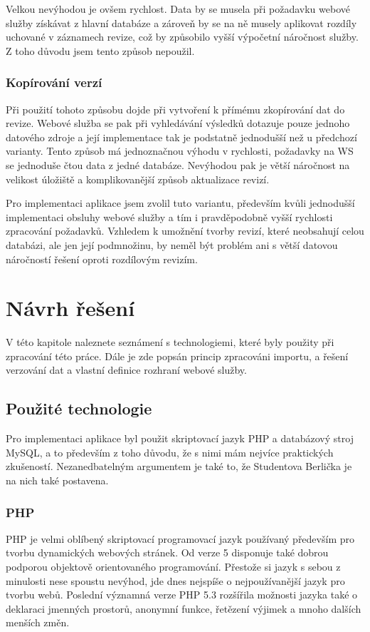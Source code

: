 \documentclass[11pt,twoside,a4paper]{book}
\begin{document}
Velkou nevýhodou je ovšem rychlost. Data by se musela při požadavku webové služby získávat z hlavní databáze a zároveň by se na ně musely aplikovat rozdíly uchované v záznamech revize, což by způsobilo vyšší výpočetní náročnost služby. Z toho důvodu jsem tento způsob nepoužil.

\subsection{Kopírování verzí}
Při použití tohoto způsobu dojde při vytvoření k přímému zkopírování dat do revize. Webové služba se pak při vyhledávání výsledků dotazuje pouze jednoho datového zdroje a její implementace tak je podstatně jednodušší než u předchozí varianty. Tento způsob má jednoznačnou výhodu v rychlosti, požadavky na WS se jednoduše čtou data z jedné databáze. Nevýhodou pak je větší náročnost na velikost úložiště a komplikovanější způsob aktualizace revizí. 

Pro implementaci aplikace jsem zvolil tuto variantu, především kvůli jednodušší implementaci obsluhy webové služby a tím i pravděpodobně vyšší rychlosti zpracování požadavků. Vzhledem k umožnění tvorby revizí, které neobsahují celou databázi, ale jen její podmnožinu, by neměl být problém ani s větší datovou náročností řešení oproti rozdílovým revizím.


\chapter{Návrh řešení}

V této kapitole naleznete seznámení s technologiemi, které byly použity při zpracování této práce. Dále je zde popsán princip zpracováni importu, a řešení verzování dat a vlastní definice rozhraní webové služby.

\section{Použité technologie}
Pro implementaci aplikace byl použit skriptovací jazyk PHP a databázový stroj MySQL, a to především z toho důvodu, že s nimi mám nejvíce praktických zkušeností. Nezanedbatelným argumentem je také to, že Studentova Berlička je na nich také postavena.

\subsection{PHP}
PHP je velmi oblíbený skriptovací programovací jazyk používaný především pro tvorbu dynamických webových stránek. Od verze 5 disponuje také dobrou podporou objektově orientovaného programování. Přestože si jazyk s sebou z minulosti nese spoustu nevýhod, jde dnes nejspíše o nejpoužívanější jazyk pro tvorbu webů. Poslední významná verze PHP 5.3 rozšířila možnosti jazyka také o deklaraci jmenných prostorů, anonymní funkce, řetězení výjimek a mnoho dalších menších změn.
\end{document}
